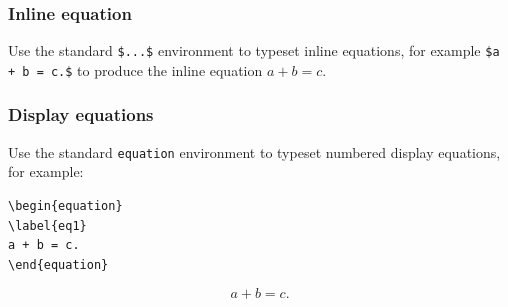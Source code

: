 \documentclass[11pt]{article}
\begin{document}
\subsubsection{Inline equation}
Use the standard \verb|$...$| environment to typeset inline equations, for example \verb|$a + b = c.$| to produce the inline equation $a + b = c.$

\subsubsection{Display equations}
\label{subsec2.3}

Use the standard \verb|equation|  environment to typeset numbered display equations, for example:
\begin{verbatim}
\begin{equation}
\label{eq1}
a + b = c.
\end{equation}
\end{verbatim}
\begin{equation}
\label{eq1}
a + b = c.
\end{equation}
\end{document}
